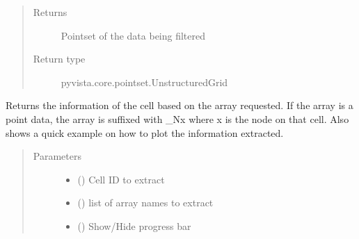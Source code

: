 \documentclass[letterpaper,10pt,english]{sphinxmanual}
\begin{document}
\begin{fulllineitems}
\begin{fulllineitems}
\begin{quote}
\begin{description}
\begin{itemize}
\end{itemize}

\item[{Returns}] \leavevmode
Pointset of the data being filtered

\item[{Return type}] \leavevmode
pyvista.core.pointset.UnstructuredGrid

\end{description}\end{quote}

\end{fulllineitems}


\begin{fulllineitems}
\label{\detokenize{openfdem:openfdem.openfdem.Model.extract_cell_info}}
Returns the information of the cell based on the array requested.
If the array is a point data, the array is suffixed with \_Nx where x is the node on that cell.
Also shows a quick example on how to plot the information extracted.
\begin{quote}\begin{description}
\item[{Parameters}] \leavevmode\begin{itemize}
\item {} 
 () \textendash{} Cell ID to extract

\item {} 
 (\sphinxstyleliteralemphasis{\sphinxupquote{{[}}}\sphinxstyleliteralemphasis{\sphinxupquote{{]}}}) \textendash{} list of array names to extract

\item {} 
 () \textendash{} Show/Hide progress bar

\end{itemize}


\end{description}
\end{quote}
\end{fulllineitems}
\end{fulllineitems}
\end{document}

